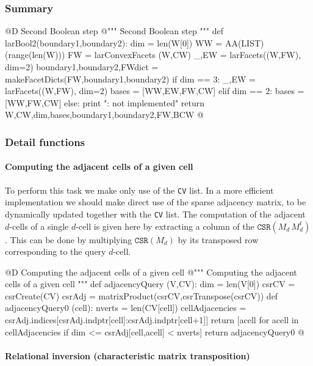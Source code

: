 \documentclass[11pt,oneside]{article}	%
\begin{document}
\subsubsection{Summary}

@D Second Boolean step
@{""" Second Boolean step """
def larBool2(boundary1,boundary2):
	dim = len(W[0])
	WW = AA(LIST)(range(len(W)))
	FW = larConvexFacets (W,CW)
	_,EW = larFacets((W,FW), dim=2)
	boundary1,boundary2,FWdict = makeFacetDicts(FW,boundary1,boundary2)
	if dim == 3: 
		_,EW = larFacets((W,FW), dim=2)
		bases = [WW,EW,FW,CW]
	elif dim == 2: bases = [WW,FW,CW]
	else: print "\nerror: not implemented\n"
	return W,CW,dim,bases,boundary1,boundary2,FW,BCW
@}

\subsubsection{Detail functions}


\paragraph{Computing the adjacent cells of a given cell}
To perform this task we make only use of the \texttt{CV} list. In a more efficient implementation we should make direct use of the sparse adjacency matrix, to be dynamically updated together with the \texttt{CV} list.
The computation of the adjacent $d$-cells of a single $d$-cell is given here by extracting a column of the $\texttt{CSR}(M_d\, M_d^t)$. This can be done by multiplying $\texttt{CSR}(M_d)$ by its transposed row corresponding to the query $d$-cell. 

@D Computing the adjacent cells of a given cell
@{""" Computing the adjacent cells of a given cell """
def adjacencyQuery (V,CV):
	dim = len(V[0])
	csrCV =  csrCreate(CV)
	csrAdj = matrixProduct(csrCV,csrTranspose(csrCV))
	def adjacencyQuery0 (cell):
		nverts = len(CV[cell])
		cellAdjacencies = csrAdj.indices[csrAdj.indptr[cell]:csrAdj.indptr[cell+1]]
		return [acell for acell in cellAdjacencies if dim <= csrAdj[cell,acell] < nverts]
	return adjacencyQuery0
@}


\paragraph{Relational inversion (characteristic matrix transposition)}
\end{document}

